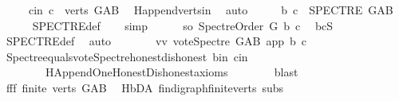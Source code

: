 \begin{isabellebody}
\ \ \ \ \ c{\isacharunderscore}{\kern0pt}in{}{\isacharcolon}{\kern0pt}\ {\isachardoublequoteopen}c\ {\isasymin}\ verts\ G{\isacharunderscore}{\kern0pt}AB{\isachardoublequoteclose}\ \isamarkupfalse%
\ H{}{\isachardot}{\kern0pt}append{\isacharunderscore}{\kern0pt}verts{\isacharunderscore}{\kern0pt}in\ \isamarkupfalse%
\ auto\isanewline
\ \ \isamarkupfalse%
\ \isamarkupfalse%
\ {\isachardoublequoteopen}{\isacharparenleft}{\kern0pt}b{\isacharcomma}{\kern0pt}\ c{\isacharparenright}{\kern0pt}\ {\isasymin}\ SPECTRE\ G{\isacharunderscore}{\kern0pt}AB{\isachardoublequoteclose}\isanewline
\ \ \ \ \isamarkupfalse%
\ SPECTRE{\isacharunderscore}{\kern0pt}def\ \isanewline
\ \ \isamarkupfalse%
{\isacharparenleft}{\kern0pt}simp{\isacharparenright}{\kern0pt}\isanewline
\ \ \ \ \isamarkupfalse%
\ so{\isacharcolon}{\kern0pt}\ {\isachardoublequoteopen}Spectre{\isacharunderscore}{\kern0pt}Order\ G\ b\ c{\isachardoublequoteclose}\ \isamarkupfalse%
\ bcS\ \isamarkupfalse%
\ SPECTRE{\isacharunderscore}{\kern0pt}def\ \isamarkupfalse%
\ auto\isanewline
\ \ \ \ \isamarkupfalse%
\ \isamarkupfalse%
\ vv{\isacharcolon}{\kern0pt}\ {\isachardoublequoteopen}vote{\isacharunderscore}{\kern0pt}Spectre\ G{\isacharunderscore}{\kern0pt}AB\ app\ b\ c\ {\isacharequal}{\kern0pt}\ {}{\isachardoublequoteclose}\isanewline
\ \ \ \ \ \ \isamarkupfalse%
\ Spectre{\isacharunderscore}{\kern0pt}equals{\isacharunderscore}{\kern0pt}vote{\isacharunderscore}{\kern0pt}Spectre{\isacharunderscore}{\kern0pt}honest{\isacharunderscore}{\kern0pt}dishonest\ b{\isacharunderscore}{\kern0pt}in\ c{\isacharunderscore}{\kern0pt}in\ \isanewline
\ \ \ \ \ \ \ \ H{}{\isachardot}{\kern0pt}Append{\isacharunderscore}{\kern0pt}One{\isacharunderscore}{\kern0pt}Honest{\isacharunderscore}{\kern0pt}Dishonest{\isacharunderscore}{\kern0pt}axioms\isanewline
\ \ \ \ \ \ \isamarkupfalse%
\ blast\isanewline
\ \ \ \ \isamarkupfalse%
\ fff{\isacharcolon}{\kern0pt}\ {\isachardoublequoteopen}finite\ {\isacharparenleft}{\kern0pt}verts\ G{\isacharunderscore}{\kern0pt}AB{\isacharparenright}{\kern0pt}{\isachardoublequoteclose}\ \isamarkupfalse%
\ H{}{\isachardot}{\kern0pt}bD{\isacharunderscore}{\kern0pt}A\ fin{\isacharunderscore}{\kern0pt}digraph{\isachardot}{\kern0pt}finite{\isacharunderscore}{\kern0pt}verts\ subs\ \isamarkupfalse%

\end{isabellebody}
